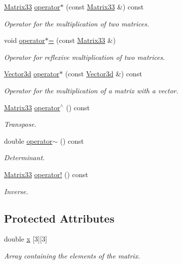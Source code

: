 \begin{DoxyCompactItemize}
$$\hyperlink{classMatrix33}{Matrix33} \hyperlink{classMatrix33_a525f14614255ff81c0cbab8060e8e065}{operator$\ast$} (const \hyperlink{classMatrix33}{Matrix33} \&) const 
\begin{DoxyCompactList}\small\item\em Operator for the multiplication of two matrices. \end{DoxyCompactList}\item 
void \hyperlink{classMatrix33_ac3937bdeb034cc83b4adcad16cd58a26}{operator$\ast$=} (const \hyperlink{classMatrix33}{Matrix33} \&)
\begin{DoxyCompactList}\small\item\em Operator for reflexive multiplication of two matrices. \end{DoxyCompactList}\item 
\hyperlink{classVector3d}{Vector3d} \hyperlink{classMatrix33_a601584a1edbaae7c6a2a2874605d6f61}{operator$\ast$} (const \hyperlink{classVector3d}{Vector3d} \&) const 
\begin{DoxyCompactList}\small\item\em Operator for the multiplication of a matrix with a vector. \end{DoxyCompactList}\item 
\hyperlink{classMatrix33}{Matrix33} \hyperlink{classMatrix33_ad4ab7b9674a44a297502282e1993ef54}{operator$^\wedge$} () const 
\begin{DoxyCompactList}\small\item\em Transpose. \end{DoxyCompactList}\item 
double \hyperlink{classMatrix33_a15b37caa6ab0d9f4a9f0d95846abd675}{operator$\sim$} () const 
\begin{DoxyCompactList}\small\item\em Determinant. \end{DoxyCompactList}\item 
\hyperlink{classMatrix33}{Matrix33} \hyperlink{classMatrix33_a1b822a20343a26b3c9bb7fd5c1247f37}{operator!} () const 
\begin{DoxyCompactList}\small\item\em Inverse. \end{DoxyCompactList}\end{DoxyCompactItemize}
\subsection*{Protected Attributes}
\begin{DoxyCompactItemize}
\item 
double \hyperlink{classMatrix33_af7f01fa466616eb7c8eda2e4d9f85cdd}{x} \mbox{[}3\mbox{]}\mbox{[}3\mbox{]}
\begin{DoxyCompactList}\small\item\em Array containing the elements of the matrix. \end{DoxyCompactList}\end{DoxyCompactItemize}


